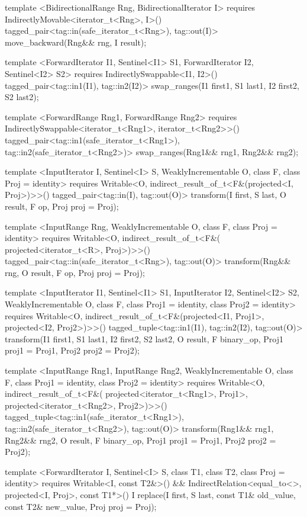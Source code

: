 \begin{codeblock}
{{{{  template <BidirectionalRange Rng, BidirectionalIterator I>
    requires IndirectlyMovable<iterator_t<Rng>, I>()
    tagged_pair<tag::in(safe_iterator_t<Rng>), tag::out(I)>
      move_backward(Rng&& rng, I result);

  template <ForwardIterator I1, Sentinel<I1> S1, ForwardIterator I2, Sentinel<I2> S2>
    requires IndirectlySwappable<I1, I2>()
    tagged_pair<tag::in1(I1), tag::in2(I2)>
      swap_ranges(I1 first1, S1 last1, I2 first2, S2 last2);

  template <ForwardRange Rng1, ForwardRange Rng2>
    requires IndirectlySwappable<iterator_t<Rng1>, iterator_t<Rng2>>()
    tagged_pair<tag::in1(safe_iterator_t<Rng1>), tag::in2(safe_iterator_t<Rng2>)>
      swap_ranges(Rng1&& rng1, Rng2&& rng2);

  template <InputIterator I, Sentinel<I> S, WeaklyIncrementable O, class F, class Proj = identity>
    requires Writable<O, indirect_result_of_t<F&(projected<I, Proj>)>>()
    tagged_pair<tag::in(I), tag::out(O)>
      transform(I first, S last, O result, F op, Proj proj = Proj{});

  template <InputRange Rng, WeaklyIncrementable O, class F, class Proj = identity>
    requires Writable<O, indirect_result_of_t<F&(
      projected<iterator_t<R>, Proj>)>>()
    tagged_pair<tag::in(safe_iterator_t<Rng>), tag::out(O)>
      transform(Rng&& rng, O result, F op, Proj proj = Proj{});

  template <InputIterator I1, Sentinel<I1> S1, InputIterator I2, Sentinel<I2> S2,
      WeaklyIncrementable O, class F, class Proj1 = identity, class Proj2 = identity>
    requires Writable<O, indirect_result_of_t<F&(projected<I1, Proj1>,
      projected<I2, Proj2>)>>()
    tagged_tuple<tag::in1(I1), tag::in2(I2), tag::out(O)>
      transform(I1 first1, S1 last1, I2 first2, S2 last2, O result,
              F binary_op, Proj1 proj1 = Proj1{}, Proj2 proj2 = Proj2{});

  template <InputRange Rng1, InputRange Rng2, WeaklyIncrementable O, class F,
      class Proj1 = identity, class Proj2 = identity>
    requires Writable<O, indirect_result_of_t<F&(
      projected<iterator_t<Rng1>, Proj1>, projected<iterator_t<Rng2>, Proj2>)>>()
    tagged_tuple<tag::in1(safe_iterator_t<Rng1>),
                 tag::in2(safe_iterator_t<Rng2>),
                 tag::out(O)>
      transform(Rng1&& rng1, Rng2&& rng2, O result,
                F binary_op, Proj1 proj1 = Proj1{}, Proj2 proj2 = Proj2{});

  template <ForwardIterator I, Sentinel<I> S, class T1, class T2, class Proj = identity>
    requires Writable<I, const T2&>() &&
      IndirectRelation<equal_to<>, projected<I, Proj>, const T1*>()
    I
      replace(I first, S last, const T1& old_value, const T2& new_value, Proj proj = Proj{});

}}}}
\end{codeblock}
